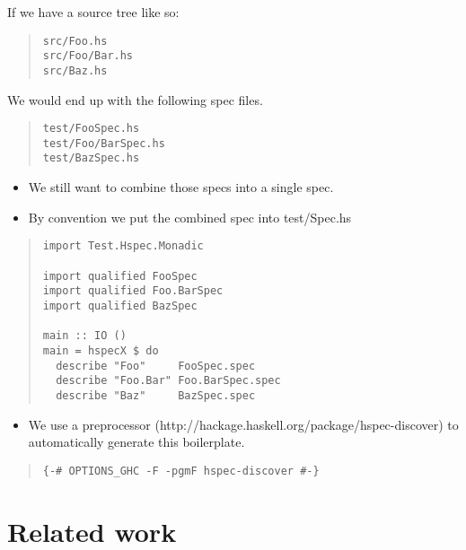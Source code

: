 \documentclass[preprint]{sigplanconf}
\begin{document}
\noindent If we have a source tree like so:

\begin{quote}
\begin{verbatim}
src/Foo.hs
src/Foo/Bar.hs
src/Baz.hs
\end{verbatim}
\end{quote}

\noindent We would end up with the following spec files.

\begin{quote}
\begin{verbatim}
test/FooSpec.hs
test/Foo/BarSpec.hs
test/BazSpec.hs
\end{verbatim}
\end{quote}

\begin{itemize}
\item We still want to combine those specs into a single spec.
\item By convention we put the combined spec into test/Spec.hs
\end{itemize}

\begin{quote}
\begin{verbatim}
import Test.Hspec.Monadic

import qualified FooSpec
import qualified Foo.BarSpec
import qualified BazSpec

main :: IO ()
main = hspecX $ do
  describe "Foo"     FooSpec.spec
  describe "Foo.Bar" Foo.BarSpec.spec
  describe "Baz"     BazSpec.spec
\end{verbatim}
\end{quote}

\begin{itemize}
\item We use a preprocessor (http://hackage.haskell.org/package/hspec-discover) to automatically generate this boilerplate.
\end{itemize}

\begin{quote}
\begin{verbatim}
{-# OPTIONS_GHC -F -pgmF hspec-discover #-}
\end{verbatim}
\end{quote}

\section{Related work}
\end{document}
